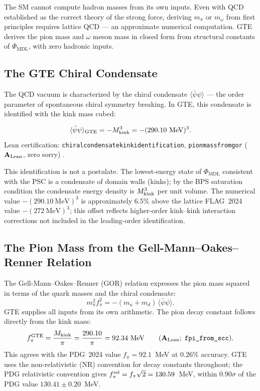 \documentclass[11pt,openany]{book}
\theoremstyle{remark}
\newcommand{\PHIMDL}{\Phi_{\mathrm{MDL}}}
\newcommand{\lean}[1]{%
  \penalty-100
  \begingroup\def\_{\textunderscore\allowbreak}\texttt{#1}\endgroup}
\newcommand{\Mkink}{M_{\rm kink}}
\newcommand{\CatAL}{\ensuremath{\textbf{A}_{\rm Lean}}}
\begin{document}
The SM cannot compute hadron masses from its own inputs.  Even with QCD established
as the correct theory of the strong force, deriving $m_\pi$ or $m_\omega$ from first
principles requires lattice QCD --- an approximate numerical computation.  GTE derives
the pion mass and $\omega$ meson mass in closed form from structural constants of
$\PHIMDL$, with zero hadronic inputs.

\subsection*{The GTE Chiral Condensate}

The QCD vacuum is characterized by the chiral condensate $\langle\bar\psi\psi\rangle$
--- the order parameter of spontaneous chiral symmetry breaking.  In GTE, this
condensate is identified with the kink mass cubed:

\begin{tcolorbox}[colback=green!5,colframe=green!50!black,title={Definition: GTE Chiral Condensate (\CatAL)}]
\[
  \langle\bar\psi\psi\rangle_{\rm GTE} = -\Mkink^3 = -(290.10~\text{MeV})^3.
\]
Lean certification: \lean{chiral\_condensate\_kink\_identification},
\lean{pion\_mass\_from\_gor} (\CatAL, zero sorry) \cite{SpivackGTEQCDStructure}.
\end{tcolorbox}

This identification is not a postulate.  The lowest-energy state of $\PHIMDL$ consistent
with the PSC is a condensate of domain walls (kinks); by the BPS saturation condition
the condensate energy density is $\Mkink^3$ per unit volume.  The numerical value
$-(290.10~\text{MeV})^3$ is approximately $6.5\%$ above the lattice FLAG~2024
value $-(272~\text{MeV})^3$; this offset reflects higher-order kink--kink interaction
corrections not included in the leading-order identification.

\subsection*{The Pion Mass from the Gell-Mann--Oakes--Renner Relation}

The Gell-Mann--Oakes--Renner (GOR) relation expresses the pion mass squared in terms
of the quark masses and the chiral condensate:
\[
  m_\pi^2 f_\pi^2 = -(m_u + m_d)\,\langle\bar\psi\psi\rangle.
\]
GTE supplies all inputs from its own arithmetic.  The pion decay constant follows
directly from the kink mass:
\begin{equation}
  f_\pi^{\rm GTE} = \frac{\Mkink}{\pi} = \frac{290.10}{\pi} = 92.34~\text{MeV}
  \qquad (\CatAL;\;\lean{fpi\_from\_scc}).
  \label{eq:fpi}
\end{equation}
This agrees with the PDG~2024 value $f_\pi = 92.1$~MeV at $0.26\%$ accuracy.
GTE uses the non-relativistic (NR) convention for decay constants throughout;
the PDG relativistic convention gives $f_\pi^{\rm rel} = f_\pi\sqrt{2} = 130.59$~MeV,
within $0.90\sigma$ of the PDG value $130.41\pm0.20$~MeV.
\end{document}
